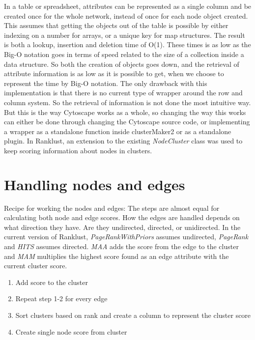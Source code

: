 In a table or spreadsheet, attributes can be represented as a single column and
be created once for the whole network, instead of once for each node object
created. This assumes that getting the objects out of the table is possible by
either indexing on a number for arrays, or a unique key for map structures.
The result is both a lookup, insertion and deletion time of O(1). These times is
as low as the Big-O notation goes in terms of speed related to the size of
a collection inside a data structure. So both the creation of objects goes
down, and the retrieval of attribute information is as low as it is possible to
get, when we choose to represent the time by Big-O notation. The only drawback
with this implementation is that there is no current type of wrapper around the
row and column system. So the retrieval of information is not done the most
intuitive way. But this is the way Cytoscape works as a whole, so changing the
way this works can either be done through changing the Cytoscape source code, or
implementing a wrapper as a standalone function inside clusterMaker2 or as
a standalone plugin. In Ranklust, an extension to the existing
\textit{NodeCluster} class was used to keep scoring information about nodes in
clusters.

\section{Handling nodes and edges}
Recipe for working the nodes and edges: The steps are almost equal for
calculating both node and edge scores. How the edges are handled depends on what
direction they have. Are they undirected, directed, or unidirected. In the
current version of Ranklust, \textit{PageRankWithPriors} assumes undirected,
\textit{PageRank} and \textit{HITS} assumes directed. \textit{MAA} adds the
score from the edge to the cluster and \textit{MAM} multiplies the highest score
found as an edge attribute with the current cluster score. 

\begin{enumerate}
    \item Add score to the cluster
    \item Repeat step 1-2 for every edge
    \item Sort clusters based on rank and create a column to represent the
        cluster score
    \item Create single node score from cluster
\end{enumerate}
